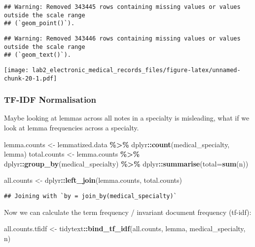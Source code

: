 \documentclass[
]{article}
\newenvironment{Shaded}{\begin{snugshade}}{\end{snugshade}}
\newcommand{\AttributeTok}[1]{\textcolor[rgb]{0.13,0.29,0.53}{#1}}
\newcommand{\FunctionTok}[1]{\textcolor[rgb]{0.13,0.29,0.53}{\textbf{#1}}}
\newcommand{\NormalTok}[1]{#1}
\newcommand{\OtherTok}[1]{\textcolor[rgb]{0.56,0.35,0.01}{#1}}
\newcommand{\SpecialCharTok}[1]{\textcolor[rgb]{0.81,0.36,0.00}{\textbf{#1}}}
\begin{document}
\begin{verbatim}
## Warning: Removed 343445 rows containing missing values or values outside the scale range
## (`geom_point()`).
\end{verbatim}

\begin{verbatim}
## Warning: Removed 343446 rows containing missing values or values outside the scale range
## (`geom_text()`).
\end{verbatim}

\texttt{[image: lab2\_electronic\_medical\_records\_files/figure-latex/unnamed-chunk-20-1.pdf]}

\subsubsection{TF-IDF Normalisation}\label{tf-idf-normalisation}

Maybe looking at lemmas across all notes in a specialty is misleading,
what if we look at lemma frequencies across a specialty.

\begin{Shaded}
\begin{Highlighting}[]
\NormalTok{lemma.counts }\OtherTok{\textless{}{-}}\NormalTok{ lemmatized.data }\SpecialCharTok{\%\textgreater{}\%}\NormalTok{ dplyr}\SpecialCharTok{::}\FunctionTok{count}\NormalTok{(medical\_specialty, lemma)}
\NormalTok{total.counts }\OtherTok{\textless{}{-}}\NormalTok{ lemma.counts }\SpecialCharTok{\%\textgreater{}\%} 
\NormalTok{                      dplyr}\SpecialCharTok{::}\FunctionTok{group\_by}\NormalTok{(medical\_specialty) }\SpecialCharTok{\%\textgreater{}\%} 
\NormalTok{                      dplyr}\SpecialCharTok{::}\FunctionTok{summarise}\NormalTok{(}\AttributeTok{total=}\FunctionTok{sum}\NormalTok{(n))}

\NormalTok{all.counts }\OtherTok{\textless{}{-}}\NormalTok{ dplyr}\SpecialCharTok{::}\FunctionTok{left\_join}\NormalTok{(lemma.counts, total.counts)}
\end{Highlighting}
\end{Shaded}

\begin{verbatim}
## Joining with `by = join_by(medical_specialty)`
\end{verbatim}

Now we can calculate the term frequency / invariant document frequency
(tf-idf):

\begin{Shaded}
\begin{Highlighting}[]
\NormalTok{all.counts.tfidf }\OtherTok{\textless{}{-}}\NormalTok{ tidytext}\SpecialCharTok{::}\FunctionTok{bind\_tf\_idf}\NormalTok{(all.counts, lemma, medical\_specialty, n) }
\end{Highlighting}
\end{Shaded}
\end{document}
